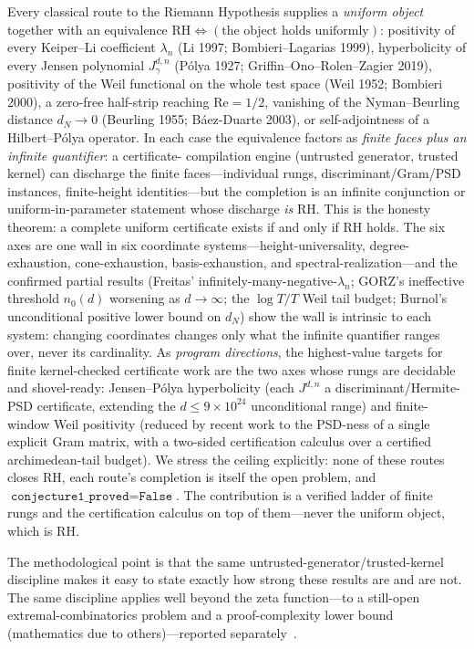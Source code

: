 Every classical route to the Riemann Hypothesis supplies a \emph{uniform
object} together with an equivalence $\mathrm{RH}\Leftrightarrow(\text{the object
holds uniformly})$: positivity of every Keiper--Li coefficient $\lambda_n$
(Li 1997; Bombieri--Lagarias 1999), hyperbolicity of every Jensen polynomial
$J^{d,n}_\gamma$ (P\'olya 1927; Griffin--Ono--Rolen--Zagier 2019), positivity of
the Weil functional on the whole test space (Weil 1952; Bombieri 2000), a
zero-free half-strip reaching $\mathrm{Re}=1/2$, vanishing of the
Nyman--Beurling distance $d_N\to 0$ (Beurling 1955; B\'aez-Duarte 2003), or
self-adjointness of a Hilbert--P\'olya operator. In each case the equivalence
factors as \emph{finite faces plus an infinite quantifier}: a certificate-
compilation engine (untrusted generator, trusted kernel) can discharge the
finite faces---individual rungs, discriminant/Gram/PSD instances, finite-height
identities---but the completion is an infinite conjunction or uniform-in-parameter
statement whose discharge \emph{is} RH. This is the honesty theorem: a complete
uniform certificate exists if and only if RH holds. The six axes are one wall in
six coordinate systems---height-universality, degree-exhaustion, cone-exhaustion,
basis-exhaustion, and spectral-realization---and the confirmed partial results
(Freitas' infinitely-many-negative-$\lambda_n$; GORZ's ineffective threshold
$n_0(d)$ worsening as $d\to\infty$; the $\log T/T$ Weil tail budget; Burnol's
unconditional positive lower bound on $d_N$) show the wall is intrinsic to each
system: changing coordinates changes only what the infinite quantifier ranges
over, never its cardinality. As \emph{program directions}, the highest-value
targets for finite kernel-checked certificate work are the two axes whose rungs
are decidable and shovel-ready: Jensen--P\'olya hyperbolicity (each
$J^{d,n}$ a discriminant/Hermite-PSD certificate, extending the
$d\le 9\times10^{24}$ unconditional range) and finite-window Weil positivity
(reduced by recent work to the PSD-ness of a single explicit Gram matrix,
with a two-sided certification calculus over a certified archimedean-tail
budget). We stress the ceiling explicitly: none of these routes closes RH, each
route's completion is itself the open problem, and $\texttt{conjecture1\_proved}
= \texttt{False}$. The contribution is a verified ladder of finite rungs and the
certification calculus on top of them---never the uniform object, which is RH.

The methodological point is that the same untrusted-generator/trusted-kernel
discipline makes it easy to state exactly how strong these results are and are
not. The same discipline applies well beyond the zeta function---to a still-open
extremal-combinatorics problem and a proof-complexity lower bound (mathematics
due to others)---reported separately~\cite{telperion-companion}.
